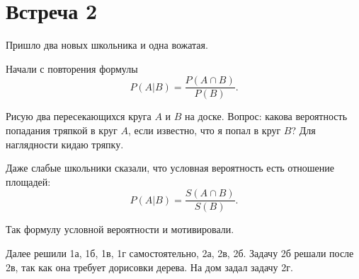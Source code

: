 \documentclass[a4paper, 12pt]{article}
\begin{document}
\section{Встреча 2}

Пришло два новых школьника и одна вожатая.

Начали с повторения формулы
\[
P(A|B) = \frac{P(A\cap B)}{P(B)}.
\]

Рисую два пересекающихся круга $A$ и $B$ на доске. Вопрос: какова вероятность попадания тряпкой в круг $A$, если известно, что я попал в круг $B$? Для наглядности кидаю тряпку.

Даже слабые школьники сказали, что условная вероятность есть отношение площадей:
\[
P(A|B) = \frac{S(A\cap B)}{S(B)}.
\]

Так формулу условной вероятности и мотивировали.

Далее решили 1а, 1б, 1в, 1г самостоятельно, 2а, 2в, 2б. Задачу 2б решали после 2в, так как она требует дорисовки дерева. На дом задал задачу 2г.
\end{document}
